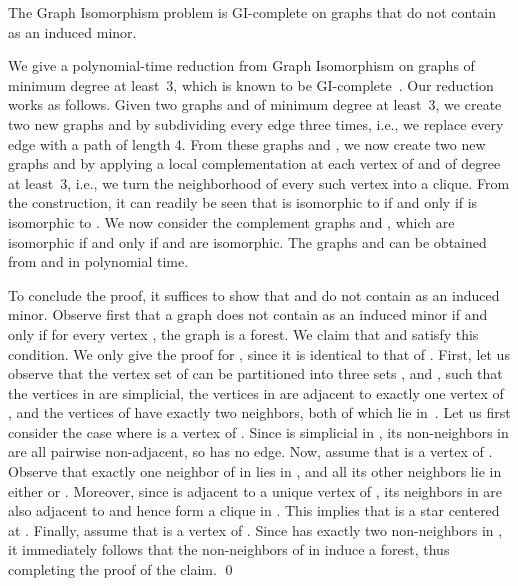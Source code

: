 \documentclass[envcountsame,envcountsect,11pt,a4paper]{llncs}
\renewenvironment{proof}{\begin{Proof}}{\qed\end{Proof}}
\begin{document}
\begin{theorem}
\label{thm:K3uK1}
The {\sc Graph Isomorphism} problem is GI-complete on graphs that do not contain  as an induced minor.
\end{theorem}
\begin{proof}
We give a polynomial-time reduction from {\sc Graph Isomorphism} on graphs of minimum degree at least~3,
which is known to be GI-complete~\cite{BoothColbourn1979}.
Our reduction works as follows. Given two graphs  and  of minimum degree at least~3, we create two new graphs  and  by
subdividing every edge three times, i.e., we replace every edge with a path of length 4. From these graphs  and , we now create two
new graphs  and  by applying a local complementation at each vertex of  and  of degree at least~3, i.e., we turn the
neighborhood of every such vertex into a clique.  From the construction, it can readily be seen that  is isomorphic to  if and only if
 is isomorphic to . We now consider the complement graphs  and , which are isomorphic if and only
if  and  are isomorphic.
The graphs  and  can be obtained from  and  in polynomial time.

To conclude the proof, it suffices to show that  and  do not contain  as an induced minor.
Observe first that a graph  does not contain  as an induced minor if and only if for every vertex , the graph
 is a forest.  We claim that  and  satisfy this condition. We only give the proof for
, since it is identical to that of .
First, let us observe that the vertex set of  can be partitioned into three sets , and ,
such that the vertices in  are simplicial, the vertices in  are adjacent to exactly one vertex of , and the vertices of  have
 exactly two neighbors, both of which lie in~. Let us first consider the case where  is a vertex of .
Since  is simplicial in , its non-neighbors in  are all pairwise non-adjacent,
so  has no edge.
Now, assume that  is a vertex of . Observe that exactly one neighbor  of  in  lies in , and all its other neighbors lie
in either  or . Moreover, since  is adjacent to a unique vertex  of , its neighbors in  are also adjacent to  and hence
form a clique in . This implies that  is a star centered at .
Finally, assume that  is a vertex of . Since  has exactly two non-neighbors in ,
it immediately follows that the non-neighbors of  in  induce a forest, thus completing the proof of the claim.
\end{proof}
\end{document}
